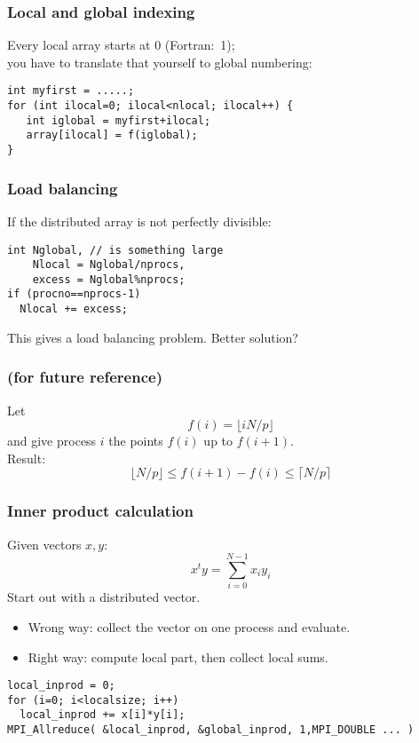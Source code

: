 \begin{frame}[containsverbatim]\frametitle{Local and global indexing}
  Every local array starts at 0 (Fortran:~1);\\
  you have to translate that yourself to global numbering:
\lstset{language=C}
\begin{lstlisting}
int myfirst = .....;
for (int ilocal=0; ilocal<nlocal; ilocal++) {
   int iglobal = myfirst+ilocal;
   array[ilocal] = f(iglobal);
}  
\end{lstlisting}
\end{frame}

\begin{frame}[containsverbatim]\frametitle{Load balancing}
If the distributed array is not perfectly divisible:
\lstset{language=C}
\begin{lstlisting}
int Nglobal, // is something large
    Nlocal = Nglobal/nprocs,
    excess = Nglobal%nprocs;
if (procno==nprocs-1) 
  Nlocal += excess;
\end{lstlisting}
This gives a load balancing problem. Better solution?
\end{frame}

\begin{frame}\frametitle{(for future reference)}
Let
\[ f(i)=\lfloor iN/p\rfloor \]
and give process $i$ the points $f(i)$ up to $f(i+1)$. \\
Result:
\[ \lfloor N/p\rfloor \leq f(i+1)-f(i)\leq \lceil N/p\rceil \]
\end{frame}

\begin{frame}[containsverbatim]\frametitle{Inner product calculation}
  Given vectors $x,y$:
  \[ x^ty = \sum_{i=0}^{N-1} x_iy_i \]
  Start out with a distributed vector.
  \begin{itemize}
  \item Wrong way: collect the vector on one process and evaluate.
  \item Right way: compute local part, then collect local sums.
  \end{itemize}
\lstset{language=C}
\begin{lstlisting}
local_inprod = 0;
for (i=0; i<localsize; i++)
  local_inprod += x[i]*y[i];
MPI_Allreduce( &local_inprod, &global_inprod, 1,MPI_DOUBLE ... ) 
\end{lstlisting}
\end{frame}

\begin{optexerciseframe}[inprod]
  
\end{optexerciseframe}

